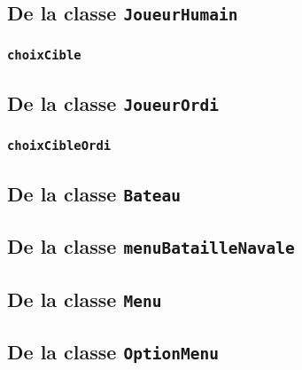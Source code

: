 \documentclass[12pt,a4paper]{article}
\begin{document}
		\subsection{De la classe \texttt{JoueurHumain}}
			\subsubsection{\texttt{choixCible}}
		\subsection{De la classe \texttt{JoueurOrdi}}
			\subsubsection{\texttt{choixCibleOrdi}}
		\subsection{De la classe \texttt{Bateau}}
			
		\subsection{De la classe \texttt{menuBatailleNavale}}
		\subsection{De la classe \texttt{Menu}}
		\subsection{De la classe \texttt{OptionMenu}}
	
\end{document}
